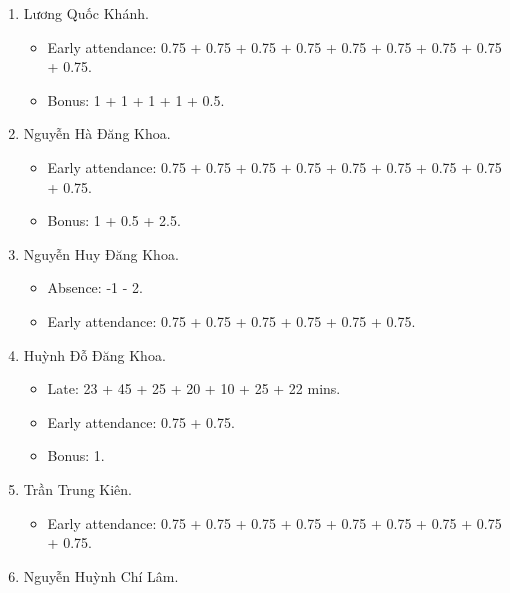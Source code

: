 \documentclass{article}
\begin{document}
\begin{enumerate}
\begin{itemize}
(birthday cake) + 0.5 (treasurer goblin) + 0.5 (replace character) + 0.5 (simple palindrome) + 1 (longest divisor interval) + 0.5 (AB again) + 0.5 (find k point fixed center) + 0.5 (destroy bridge) + 0.5 (Li Hua maze) + 1 (Gregor pawn game) + 0.5 (metro) + 0.5 (party) + 0.5 (new year transportation) + 0.5 (vicious labyrinth) + 0.5 (thorn coin) + 0.5 (gift carpet) + 0.5 (odd subarray) + 0.5 (min mex cut) + 0.5 (computer game) + 0.5 (love song) + 0.5 (stone game) + 0.5 (last minute enhancement) + 0.5 (last year substring) + 0.5 (perpendicular segment) + 0.5 (fill diamond) + 0.5 (make product equal one) + 0.5 (Sasha trip) - 51.64596 (Applied ML).
	\end{itemize}
	\item {\sc Lương Quốc Khánh.}
	\begin{itemize}
		\item Early attendance: 0.75 + 0.75 + 0.75 + 0.75 + 0.75 + 0.75 + 0.75 + 0.75 + 0.75.
		\item Bonus: 1 + 1 + 1 + 1 + 0.5.
	\end{itemize}
	\item {\sc Nguyễn Hà Đăng Khoa.}
	\begin{itemize}
		\item Early attendance: 0.75 + 0.75 + 0.75 + 0.75 + 0.75 + 0.75 + 0.75 + 0.75 + 0.75.
		\item Bonus: 1 + 0.5 + 2.5.
	\end{itemize}
	\item {\sc Nguyễn Huy Đăng Khoa.}
	\begin{itemize}
		\item Absence: -1 - 2.
		\item Early attendance: 0.75 + 0.75 + 0.75 + 0.75 + 0.75 + 0.75.
	\end{itemize}
	\item {\sc Huỳnh Đỗ Đăng Khoa.}
	\begin{itemize}
		\item Late: 23 + 45 + 25 + 20 + 10 + 25 + 22 mins.
		\item Early attendance: 0.75 + 0.75.
        \item Bonus: 1.
	\end{itemize}
	\item {\sc Trần Trung Kiên.}
	\begin{itemize}
		\item Early attendance: 0.75 + 0.75 + 0.75 + 0.75 + 0.75 + 0.75 + 0.75 + 0.75 + 0.75.
	\end{itemize}
	\item {\sc Nguyễn Huỳnh Chí Lâm.}

\end{enumerate}
\end{document}
